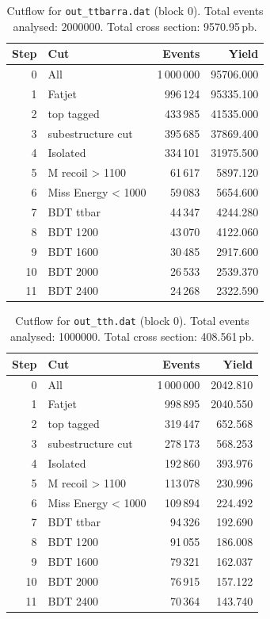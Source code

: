 \documentclass{article}
\begin{document}
\begin{table}[H]
\centering
\begin{tabular}{r l r r}
\toprule
Step & Cut & Events & Yield \\
\midrule
0 & All & 1\,000\,000 & 95706.000 \\
1 & Fatjet & 996\,124 & 95335.100 \\
2 & top tagged & 433\,985 & 41535.000 \\
3 & subestructure cut & 395\,685 & 37869.400 \\
4 & Isolated & 334\,101 & 31975.500 \\
5 & M recoil > 1100 & 61\,617 & 5897.120 \\
6 & Miss Energy < 1000 & 59\,083 & 5654.600 \\
7 & BDT ttbar & 44\,347 & 4244.280 \\
8 & BDT 1200 & 43\,070 & 4122.060 \\
9 & BDT 1600 & 30\,485 & 2917.600 \\
10 & BDT 2000 & 26\,533 & 2539.370 \\
11 & BDT 2400 & 24\,268 & 2322.590 \\
\bottomrule
\end{tabular}
\caption{Cutflow for \texttt{out\_ttbarra.dat} (block 0). Total events analysed: 2000000. Total cross section: 9570.95\,pb.}
\label{tab:cutflow-out-ttbarra-dat}
\end{table}

\begin{table}[H]
\centering
\begin{tabular}{r l r r}
\toprule
Step & Cut & Events & Yield \\
\midrule
0 & All & 1\,000\,000 & 2042.810 \\
1 & Fatjet & 998\,895 & 2040.550 \\
2 & top tagged & 319\,447 & 652.568 \\
3 & subestructure cut & 278\,173 & 568.253 \\
4 & Isolated & 192\,860 & 393.976 \\
5 & M recoil > 1100 & 113\,078 & 230.996 \\
6 & Miss Energy < 1000 & 109\,894 & 224.492 \\
7 & BDT ttbar & 94\,326 & 192.690 \\
8 & BDT 1200 & 91\,055 & 186.008 \\
9 & BDT 1600 & 79\,321 & 162.037 \\
10 & BDT 2000 & 76\,915 & 157.122 \\
11 & BDT 2400 & 70\,364 & 143.740 \\
\bottomrule
\end{tabular}
\caption{Cutflow for \texttt{out\_tth.dat} (block 0). Total events analysed: 1000000. Total cross section: 408.561\,pb.}
\label{tab:cutflow-out-tth-dat}
\end{table}
\end{document}
